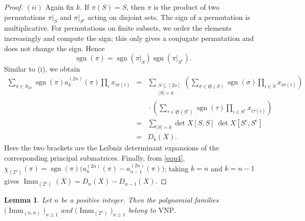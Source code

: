 \documentclass[11pt,a4paper]{article}
\newtheorem{lemma}[theorem]{Lemma}
\begin{document}
\begin{proof}
$(ii)$ Again fix $k$. If $\pi(S)=S$, then $\pi$ is the product of two permutations $\pi|_S$ and $\pi|_{S^{\mathrm{c}}}$ acting on disjoint sets. The sign of a permutation is multiplicative. For permutations on finite subsets, we order the elements increasingly and compute the sign; this only gives a conjugate permutation and does not change the sign. Hence
\[
  \operatorname{sgn}(\pi)
  =\operatorname{sgn}(\pi|_S)\operatorname{sgn}(\pi|_{S^{\mathrm{c}}}).
\]
Similar to (i), we obtain
\begin{eqnarray*}
  \sum_{\pi\in S_{2n}}\operatorname{sgn}(\pi)a_k^{(2n)}(\pi)
  \prod_i x_{i\pi(i)}
  &=&\sum_{\substack{S\subseteq[2n]\\|S|=k}}
    \left(\sum_{\sigma\in \mathfrak S(S)}\operatorname{sgn}(\sigma)
      \prod_{i\in S}x_{i\sigma(i)}\right)\\
  &&{}\cdot
    \left(\sum_{\tau\in \mathfrak S(S^{\mathrm{c}})}\operatorname{sgn}(\tau)
      \prod_{i\in S^{\mathrm{c}}}x_{i\tau(i)}\right)\\
  &=&\sum_{|S|=k}\operatorname{det} X[S,S]~\operatorname{det} X[S^{\mathrm{c}},S^{\mathrm{c}}]  \\
  &=&D_k(X).
\end{eqnarray*}
Here the two brackets are the Leibniz determinant expansions of the corresponding principal submatrices. Finally, from \eqref{equ4}, $\chi_{(2^n)}(\pi)=\operatorname{sgn}(\pi)\bigl(a_n^{(2n)}(\pi)-a_{n-1}^{(2n)}(\pi)\bigr)$; taking $k=n$ and $k=n-1$ gives $\operatorname{Imm}_{(2^n)}(X)=D_n(X)-D_{n-1}(X)$.
\end{proof}

\begin{lemma}\label{lem2.3}
Let $n$ be a positive integer. Then the polynomial families $\bigl(\operatorname{Imm}_{(n,n)}\bigr)_{n\geq1}$
and $\bigl(\operatorname{Imm}_{(2^n)}\bigr)_{n\geq1}$ belong to $\mathrm{VNP}$.
\end{lemma}
\end{document}

